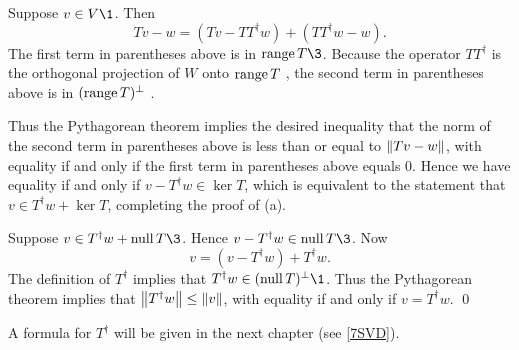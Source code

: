 \proof
\begin{subtheorem}
\item
Suppose $v \in V\1$. Then
\[
Tv - w = (Tv - TT^\dagger w) + (TT^\dagger w - w).
\]
The first term in parentheses above is in $\ran T\3$. Because the operator $TT^\dagger$ is the orthogonal projection of $W$ onto $\ran T$ , the second term in parentheses above is in $(\ran T)^\perp$ .

Thus the Pythagorean theorem implies the desired inequality that the norm of the second term in parentheses above is less than or equal to $\norm{Tv - w}$, with equality if and only if the first term in parentheses above equals $0$. Hence we have equality if and only if $v - T^\dagger w \in \ker T$, which is equivalent to the statement that $v \in T^\dagger w + \ker T$, completing the proof of (a).

\item
Suppose $v \in T^\dagger w + \ker T\3$. Hence $v - T^\dagger w \in \ker T\3$. Now
\[
v = (v - T^\dagger w) + T^\dagger w.
\]
The definition of $T^\dagger$ implies that $T^\dagger w \in (\ker T)^\perp\1$. Thus the Pythagorean theorem implies that
$\norm[\big]{T^\dagger w} \le \norm{v}$, with equality if and only if $v = T^\dagger w$.
\qed
\end{subtheorem}

A formula for $T^\dagger$ will be given in the next chapter (see \ref{7SVD}).

